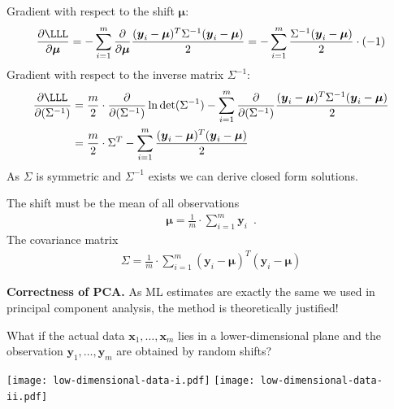 \documentclass[landscape,footrule]{foils}
\renewcommand{\vec}[1]{\boldsymbol{#1}}
\newcommand{\lastline}{\vspace*{-2ex}}
\begin{document}

Gradient with respect to the shift $\vec{\mu}$: 
\begin{align*}
\frac{\partial\LLL}{\partial\vec{\mu}}= -\sum_{i=1}^m\frac{\partial}{\partial\vec{\mu}}\frac{(\vec{y}_i-\vec{\mu})^T \Sigma^{-1}(\vec{y}_i-\vec{\mu})}{2}
=-\sum_{i=1}^m\frac{\Sigma^{-1}(\vec{y}_i-\vec{\mu})}{2}\cdot(-1)
\end{align*}
Gradient with respect to the inverse matrix $\Sigma^{-1}$: 
\begin{align*}
\frac{\partial\LLL}{\partial(\Sigma^{-1})}&=\frac{m}{2}\cdot \frac{\partial}{\partial(\Sigma^{-1})} \ln\det(\Sigma^{-1}) -\sum_{i=1}^m\frac{\partial}{\partial(\Sigma^{-1})}\frac{(\vec{y}_i-\vec{\mu})^T \Sigma^{-1}(\vec{y}_i-\vec{\mu})}{2}\\
&=\frac{m}{2}\cdot\Sigma^{T} -\sum_{i=1}^m\frac{(\vec{y}_i-\vec{\mu})^T (\vec{y}_i-\vec{\mu})}{2}
\end{align*}
As $\Sigma$ is symmetric and $\Sigma^{-1}$ exists we can derive closed form solutions.


The shift must be the mean of all observations
\begin{align*}
\vec{\mu}=\frac{1}{m}\cdot \sum_{i=1}^m\vec{y}_i\enspace.
\end{align*} 
The covariance matrix 
\begin{align*}
\Sigma=\frac{1}{m}\cdot\sum_{i=1}^m(\vec{y}_i-\vec{\mu})^T (\vec{y}_i-\vec{\mu})
\end{align*}

\textbf{Correctness of PCA.}
As ML estimates are exactly the same  we used in principal component analysis, the method is theoretically justified!\lastline




What if the actual data $\vec{x}_1,\ldots,\vec{x}_m$ lies in a lower-dimensional plane and the observation  $\vec{y}_1,\ldots,\vec{y}_m$ are obtained by random shifts?   



\begin{center}
\texttt{[image: low-dimensional-data-i.pdf]}
\texttt{[image: low-dimensional-data-ii.pdf]}
\end{center}\vspace*{-1cm}
\end{document}
